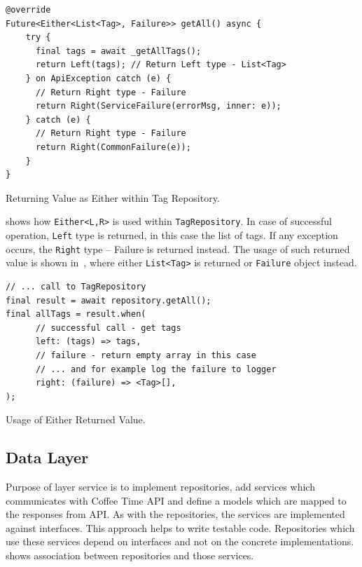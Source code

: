 \begin{listing}[ht]
\begin{verbatim}
@override
Future<Either<List<Tag>, Failure>> getAll() async {
    try {
      final tags = await _getAllTags();
      return Left(tags); // Return Left type - List<Tag>
    } on ApiException catch (e) {
      // Return Right type - Failure
      return Right(ServiceFailure(errorMsg, inner: e));
    } catch (e) {
      // Return Right type - Failure
      return Right(CommonFailure(e));
    }
}
\end{verbatim}
\caption{Returning Value as Either within Tag Repository.}
\label{listing:ct-either-repo}
\end{listing}

 shows how \verb|Either<L,R>| is used within \verb|TagRepository|. In case of successful operation, \verb|Left| type is returned, in this case the list of tags. If any exception occurs, the \verb|Right| type -- Failure is returned instead. The usage of such returned value is shown in~, where either \verb|List<Tag>| is returned or \verb|Failure| object instead.   

\begin{listing}[ht]
\begin{verbatim}
// ... call to TagRepository
final result = await repository.getAll();
final allTags = result.when(
      // successful call - get tags
      left: (tags) => tags,
      // failure - return empty array in this case
      // ... and for example log the failure to logger
      right: (failure) => <Tag>[], 
);
\end{verbatim}
\caption{Usage of Either Returned Value.}
\label{listing:ct-either-usage}
\end{listing}

\subsection{Data Layer}
Purpose of layer service is to implement repositories, add services which communicates with Coffee Time API and define a models which are mapped to the responses from API. As with the repositories, the services are implemented against interfaces. This approach helps to write testable code. Repositories which use these services depend on interfaces and not on the concrete implementations.  shows association between repositories and those services. 

